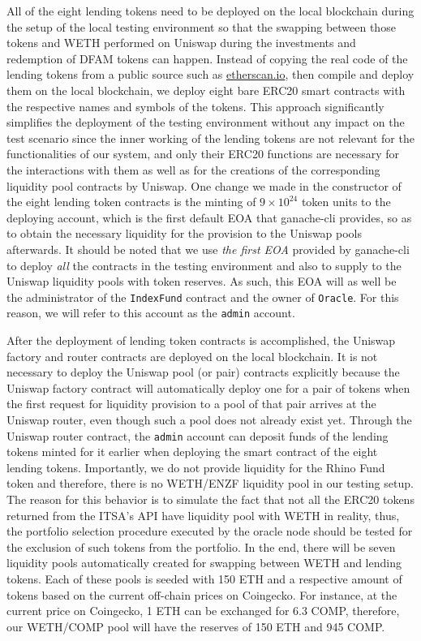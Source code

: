 All of the eight lending tokens need to be deployed on the local blockchain during the setup of the local testing environment so that the swapping between those tokens and WETH performed on Uniswap during the investments and redemption of DFAM tokens can happen. Instead of copying the real code of the lending tokens from a public source such as \url{etherscan.io}, then compile and deploy them on the local blockchain, we deploy eight bare ERC20 smart contracts with the respective names and symbols of the tokens. This approach significantly simplifies the deployment of the testing environment without any impact on the test scenario since the inner working of the lending tokens are not relevant for the functionalities of our system, and only their ERC20 functions are necessary for the interactions with them as well as for the creations of the corresponding liquidity pool contracts by Uniswap. One change we made in the constructor of the eight lending token contracts is the minting of $9 \times 10^{24}$ token units to the deploying account, which is the first default EOA that ganache-cli provides, so as to obtain the necessary liquidity for the provision to the Uniswap pools afterwards. It should be noted that we use \textit{the first EOA} provided by ganache-cli to deploy \textit{all} the contracts in the testing environment and also to supply to the Uniswap liquidity pools with token reserves. As such, this EOA will as well be the administrator of the \texttt{IndexFund} contract and the owner of \texttt{Oracle}. For this reason, we will refer to this account as the \texttt{admin} account. 

After the deployment of lending token contracts is accomplished, the Uniswap factory and router contracts are deployed on the local blockchain. It is not necessary to deploy the Uniswap pool (or pair) contracts explicitly because the Uniswap factory contract will automatically deploy one for a pair of tokens when the first request for liquidity  provision to a pool of that pair arrives at the Uniswap router, even though such a pool does not already exist yet. Through the Uniswap router contract, the \texttt{admin} account can deposit funds of the lending tokens minted for it earlier when deploying the smart contract of the eight lending tokens. Importantly, we do not provide liquidity for the Rhino Fund token and therefore, there is no WETH/ENZF liquidity pool in our testing setup. The reason for this behavior is to simulate the fact that not all the ERC20 tokens returned from the ITSA's API have liquidity pool with WETH in reality, thus, the portfolio selection procedure executed by the oracle node should be tested for the exclusion of such tokens from the portfolio. In the end, there will be seven liquidity pools automatically created for swapping between WETH and lending tokens. Each of these pools is seeded with 150 ETH and a respective amount of tokens based on the current off-chain prices on Coingecko. For instance, at the current price on Coingecko, 1 ETH can be exchanged for 6.3 COMP, therefore, our WETH/COMP pool will have the reserves of 150 ETH and 945 COMP.

